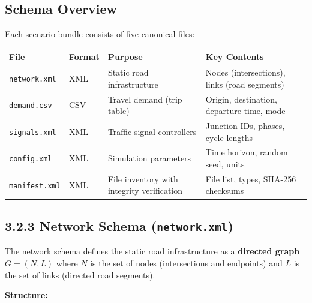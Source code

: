 \subsection{Schema Overview}\label{322-schema-overview}

Each scenario bundle consists of five canonical files:

\begin{longtable}[]{@{}llll@{}}
\toprule\noalign{}
File & Format & Purpose & Key Contents \\
\midrule\noalign{}
\endhead
\bottomrule\noalign{}
\endlastfoot
\texttt{network.xml} & XML & Static road infrastructure & Nodes
(intersections), links (road segments) \\
\texttt{demand.csv} & CSV & Travel demand (trip table) & Origin,
destination, departure time, mode \\
\texttt{signals.xml} & XML & Traffic signal controllers & Junction IDs,
phases, cycle lengths \\
\texttt{config.xml} & XML & Simulation parameters & Time horizon, random
seed, units \\
\texttt{manifest.xml} & XML & File inventory with integrity verification
& File list, types, SHA-256 checksums \\
\end{longtable}

\subsection{\texorpdfstring{3.2.3 Network Schema
(\texttt{network.xml})}{3.2.3 Network Schema (network.xml)}}\label{323-network-schema-networkxml}

The network schema defines the static road infrastructure as a
\textbf{directed graph} \(G = (N, L)\) where \(N\) is the set of nodes
(intersections and endpoints) and \(L\) is the set of links (directed
road segments).

\textbf{Structure:}

